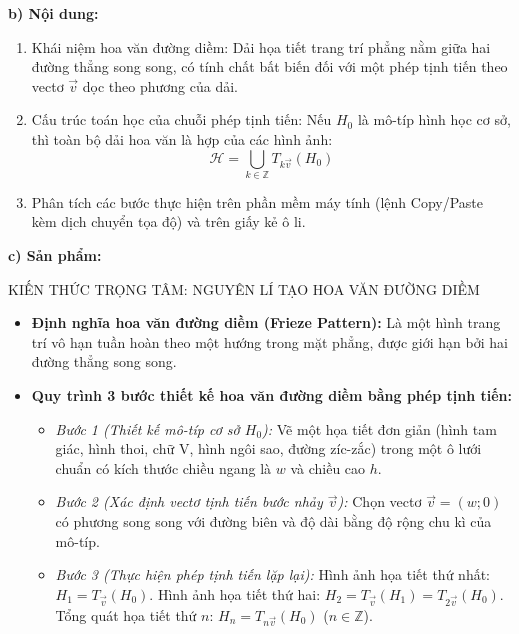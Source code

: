 \documentclass[12pt, a4paper]{article}
\renewcommand{\vec}[1]{\overrightarrow{#1}}
\begin{document}
\noindent \textbf{b) Nội dung:}  
\begin{enumerate}[leftmargin=0.6cm]  
    \item Khái niệm hoa văn đường diềm: Dải họa tiết trang trí phẳng nằm giữa hai đường thẳng song song, có tính chất bất biến đối với một phép tịnh tiến theo vectơ $\vec{v}$ dọc theo phương của dải.  
    \item Cấu trúc toán học của chuỗi phép tịnh tiến: Nếu $H_0$ là mô-típ hình học cơ sở, thì toàn bộ dải hoa văn là hợp của các hình ảnh:  
    $$\mathcal{H} = \bigcup_{k \in \mathbb{Z}} T_{k\vec{v}}(H_0)$$  
    \item Phân tích các bước thực hiện trên phần mềm máy tính (lệnh Copy/Paste kèm dịch chuyển tọa độ) và trên giấy kẻ ô li.  
\end{enumerate}  
  
\noindent \textbf{c) Sản phẩm:}  
  
\begin{pedabox}{KIẾN THỨC TRỌNG TÂM: NGUYÊN LÍ TẠO HOA VĂN ĐƯỜNG DIỀM}  
\begin{itemize}[leftmargin=0.6cm]  
    \item \textbf{Định nghĩa hoa văn đường diềm (Frieze Pattern):} Là một hình trang trí vô hạn tuần hoàn theo một hướng trong mặt phẳng, được giới hạn bởi hai đường thẳng song song.  
    \item \textbf{Quy trình 3 bước thiết kế hoa văn đường diềm bằng phép tịnh tiến:}  
    \begin{itemize}  
        \item \textit{Bước 1 (Thiết kế mô-típ cơ sở $H_0$):} Vẽ một họa tiết đơn giản (hình tam giác, hình thoi, chữ V, hình ngôi sao, đường zíc-zắc) trong một ô lưới chuẩn có kích thước chiều ngang là $w$ và chiều cao $h$.  
        \item \textit{Bước 2 (Xác định vectơ tịnh tiến bước nhảy $\vec{v}$):} Chọn vectơ $\vec{v} = (w; 0)$ có phương song song với đường biên và độ dài bằng độ rộng chu kì của mô-típ.  
        \item \textit{Bước 3 (Thực hiện phép tịnh tiến lặp lại):}  
        Hình ảnh họa tiết thứ nhất: $H_1 = T_{\vec{v}}(H_0)$.  
        Hình ảnh họa tiết thứ hai: $H_2 = T_{\vec{v}}(H_1) = T_{2\vec{v}}(H_0)$.  
        Tổng quát họa tiết thứ $n$: $H_n = T_{n\vec{v}}(H_0)$ ($n \in \mathbb{Z}$).  
    \end{itemize}  
\end{itemize}  
\end{pedabox}  
  
\end{document}
